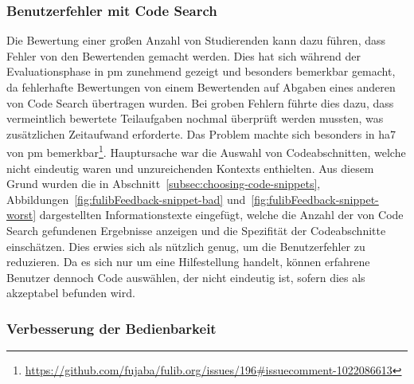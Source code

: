 \subsubsection{Benutzerfehler mit Code Search}

Die Bewertung einer großen Anzahl von Studierenden kann dazu führen, dass Fehler von den Bewertenden gemacht werden.
Dies hat sich während der Evaluationsphase in \ac{pm} zunehmend gezeigt und besonders bemerkbar gemacht, da fehlerhafte Bewertungen von einem Bewertenden auf Abgaben eines anderen von Code Search übertragen wurden.
Bei groben Fehlern führte dies dazu, dass vermeintlich bewertete Teilaufgaben nochmal überprüft werden mussten, was zusätzlichen Zeitaufwand erforderte.
Das Problem machte sich besonders in \ac{ha}7 von \ac{pm} bemerkbar\footnote{
    \url{https://github.com/fujaba/fulib.org/issues/196\#issuecomment-1022086613}
}.
Hauptursache war die Auswahl von Codeabschnitten, welche nicht eindeutig waren und unzureichenden Kontexts enthielten.
Aus diesem Grund wurden die in Abschnitt~\ref{subsec:choosing-code-snippets}, Abbildungen~\ref{fig:fulibFeedback-snippet-bad} und~\ref{fig:fulibFeedback-snippet-worst} dargestellten Informationstexte eingefügt, welche die Anzahl der von Code Search gefundenen Ergebnisse anzeigen und die Spezifität der Codeabschnitte einschätzen.
Dies erwies sich als nützlich genug, um die Benutzerfehler zu reduzieren.
Da es sich nur um eine Hilfestellung handelt, können erfahrene Benutzer dennoch Code auswählen, der nicht eindeutig ist, sofern dies als akzeptabel befunden wird.

\subsubsection{Verbesserung der Bedienbarkeit}

